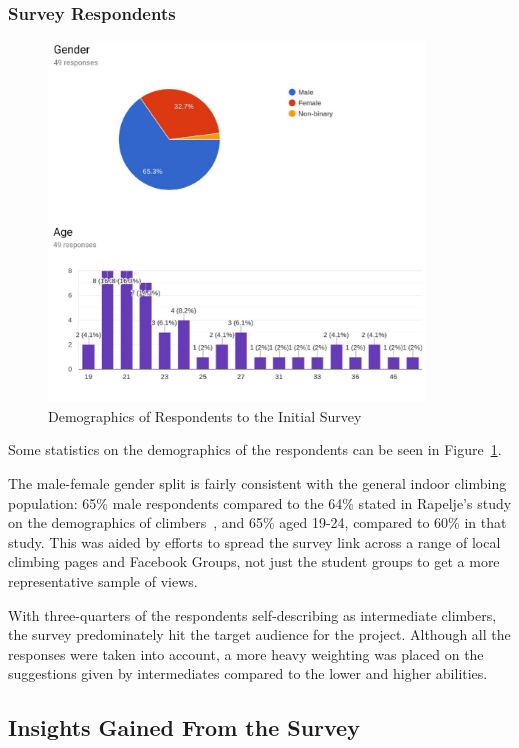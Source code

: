 \subsubsection{Survey Respondents}

\begin{figure}[h]
\centering
\includegraphics[width=10cm]{imgs/surveydemographics}
\caption{Demographics of Respondents to the Initial Survey}
\label{fig:surveydemographics}
\end{figure}
Some statistics on the demographics of the respondents can be seen in Figure~\ref{fig:surveydemographics}.

The male-female gender split is fairly consistent with the general indoor climbing population: 65\% male respondents compared to the 64\% stated in Rapelje's study on the demographics of climbers~\cite{climbing-sub-worlds}, and 65\% aged 19-24, compared to 60\% in that study.
This was aided by efforts to spread the survey link across a range of local climbing pages and Facebook Groups, not just the student groups to get a more representative sample of views.

With three-quarters of the respondents self-describing as intermediate climbers, the survey predominately hit the target audience for the project. 
Although all the responses were taken into account, a more heavy weighting was placed on the suggestions given by intermediates compared to the lower and higher abilities.


\subsection{Insights Gained From the Survey}
